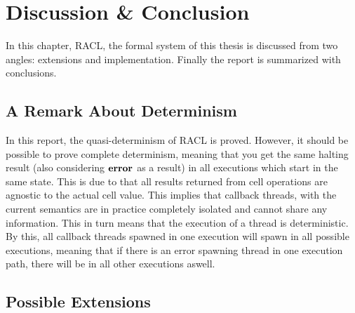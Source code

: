 \chapter{Discussion \& Conclusion}
\label{cha:discussion_and_conclusion}

In this chapter, RACL, the formal system of this thesis is discussed from two
angles: extensions and implementation. Finally the report is summarized with
conclusions.


\section{A Remark About Determinism}%
\label{sec:a_remark_about_determinism}

In this report, the quasi-determinism of RACL is proved. However, it
should be possible to prove complete determinism, meaning that you get the same
halting result (also considering $\mbox{{\bf error}}$ as a result) in all executions which
start in the same state. This is due to that all results returned from cell
operations are agnostic to the actual cell value.  This implies that callback
threads, with the current semantics are in practice completely isolated and
cannot share any information. This in turn means that the execution of a thread
is deterministic. By this, all callback threads spawned in one execution will
spawn in all possible executions, meaning that if there is an error spawning
thread in one execution path, there will be in all other executions aswell.

\section{Possible Extensions}%
\label{sec:extensions}

